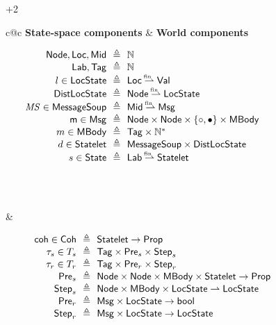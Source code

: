 \begin{figure}[t]
{\begin{varwidth}{\dimexpr\textwidth+2\fboxrule\relax}
\begin{tabular}{c@{\!\!\!\!\!\!\!\!\!\!}c}
\small{\textbf{State-space components}}
&
\small{\textbf{World components}}
\\
\begin{minipage}{0.5\linewidth}
{\scriptsize{
\[
\!\!\!\!\!\!\!\!\!\!\!\!\!
\begin{array}{r@{\ \ }c@{\ \ }l}
\Node, \Loc, \Mid & \eqdef & \Nat \\
\Lab, \Tag & \eqdef & \Nat \\
l \in \LocalState & \eqdef & \Loc \pmap \Val \\
\DLState & \eqdef & \Node \pmap \LocalState \\
  \MS \in\MessageSoup & \eqdef & \Mid \pmap \Msg \\
  \msg \in \Msg & \eqdef & \Node \times \Node \times \set{\Active,
                              \Consumed} \times \Mbody \\
  m \in \Mbody & \eqdef & \Tag \times \Nat^* \\
  d \in \Statelet & \eqdef & \MessageSoup \times \DLState \\
  s\in \State & \eqdef & \Lab \pmap \Statelet \\
\\ \\ \\
\end{array}
\]
}}
\end{minipage}
&
\begin{minipage}{0.5\linewidth}
{\scriptsize{
\[
\begin{array}{r@{\ \ }c@{\ \ }l}
  \coh \in \mathsf{Coh} & \eqdef & \Statelet \fun \Prop \\
  \Trans_s \in \Transitions_s & \eqdef & \Tag \times \Pre_s \times \Step_s \\
  \Trans_r \in \Transitions_r & \eqdef & \Tag \times \Pre_r \times \Step_r \\
  \Pre_s & \eqdef & \Node \times \Node \times \Mbody \times \Statelet
   \fun \Prop \\
  \Step_s & \eqdef & \Node \times \Mbody \times \LocalState \pfun \LocalState \\
  \Pre_r & \eqdef & \Msg \times \LocalState \fun \bool \\
  \Step_r & \eqdef & \Msg \times \LocalState \fun \LocalState \\

\end{array}\]}}
\end{minipage}
\end{tabular}
\end{varwidth}}
\end{figure}
